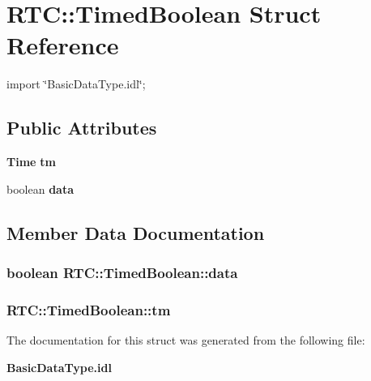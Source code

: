 \section{RTC::TimedBoolean Struct Reference}
\label{structRTC_1_1TimedBoolean}


{\ttfamily import \char`\"{}BasicDataType.idl\char`\"{};}

\subsection*{Public Attributes}
\begin{DoxyCompactItemize}
\item 
{\bf Time} {\bf tm}
\item 
boolean {\bf data}
\end{DoxyCompactItemize}


\subsection{Member Data Documentation}
\subsubsection[{data}]{\setlength{\rightskip}{0pt plus 5cm}boolean {\bf RTC::TimedBoolean::data}}\label{structRTC_1_1TimedBoolean_a13a5e2dcf6f1f84895268e835a1a504c}
\subsubsection[{tm}]{ {\bf RTC::TimedBoolean::tm}}\label{structRTC_1_1TimedBoolean_aa07e1f41460e4542fe94af48e0e0135e}


The documentation for this struct was generated from the following file:\begin{DoxyCompactItemize}
\item 
{\bf BasicDataType.idl}\end{DoxyCompactItemize}
